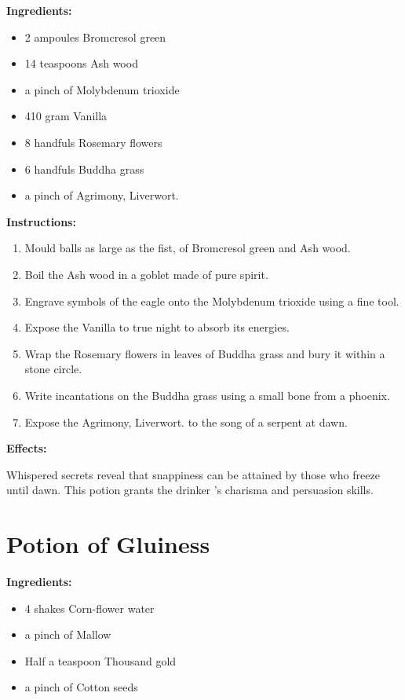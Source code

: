 \documentclass{article}
\begin{document}
\textbf{Ingredients:}

\begin{itemize}
  \item 2 ampoules Bromcresol green
  \item 14 teaspoons Ash wood
  \item a pinch of Molybdenum trioxide
  \item 410 gram Vanilla
  \item 8 handfuls Rosemary flowers
  \item 6 handfuls Buddha grass
  \item a pinch of Agrimony, Liverwort.
\end{itemize}

\textbf{Instructions:}

\begin{enumerate}
  \item Mould balls as large as the fist, of Bromcresol green and Ash wood.
  \item Boil the Ash wood in a goblet made of pure spirit.
  \item Engrave symbols of the eagle onto the Molybdenum trioxide using a fine tool.
  \item Expose the Vanilla to true night to absorb its energies.
  \item Wrap the Rosemary flowers in leaves of Buddha grass and bury it within a stone circle.
  \item Write incantations on the Buddha grass using a small bone from a phoenix.
  \item Expose the Agrimony, Liverwort. to the song of a serpent at dawn.
\end{enumerate}

\textbf{Effects:}

Whispered secrets reveal that snappiness can be attained by those who freeze until dawn. This potion grants the drinker 's charisma and persuasion skills.

\newpage
\section*{Potion of Gluiness}

\textbf{Ingredients:}

\begin{itemize}
  \item 4 shakes Corn-flower water
  \item a pinch of Mallow
  \item Half a teaspoon Thousand gold
  \item a pinch of Cotton seeds
\end{itemize}
\end{document}
